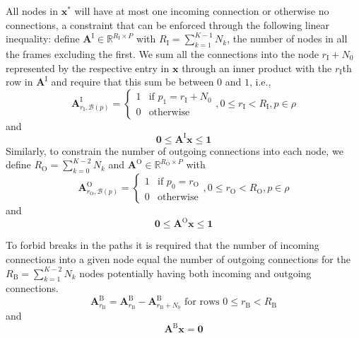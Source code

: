 \documentclass{article}
\newcommand{\BS}[1]{\boldsymbol{#1}}
\begin{document}
\begin{sloppy}
All nodes in $\BS{x}^{\ast}$ will have at most one incoming connection or
otherwise no connections, a constraint that can be enforced through the
following linear inequality: define $\BS{A}^{\text{I}} \in
\mathbb{R}^{R_{\text{I}} \times P}$ with $R_{\text{I}} = \sum_{k=1}^{K-1}
N_{k}$, the number of nodes in all the frames excluding the first. We sum all
the connections into the node $r_{\text{I}} + N_{0}$ represented by the
respective entry in $\BS{x}$ through an inner product with the $r_{\text{I}}$th
row in $\BS{A}^{\text{I}}$ and require that this sum be between $0$ and $1$,
i.e.,
\begin{equation}
    \BS{A}^{\text{I}}_{r_{\text{I}},\mathcal{B}(p)} = \begin{cases}
        1 & \text{if } p_{1} = r_{\text{I}}+N_{0} \\
        0 & \text{otherwise}
    \end{cases}, 0 \leq r_{\text{I}} < R_{\text{I}}, p \in \rho
\end{equation}
and
\begin{equation}
    \BS{0} \leq \BS{A}^{\text{I}}\BS{x} \leq \BS{1}
\end{equation}
Similarly, to constrain the number of outgoing connections into each node, we
define $R_{\text{O}} = \sum_{k=0}^{K-2} N_{k}$ and
$\BS{A}^{\text{O}} \in \mathbb{R}^{R_{\text{O}} \times P}$ with
\begin{equation}
    \BS{A}^{\text{O}}_{r_{\text{O}},\mathcal{B}(p)} = \begin{cases}
        1 & \text{if } p_{0} = r_{\text{O}} \\
        0 & \text{otherwise}
    \end{cases}, 0 \leq r_{\text{O}} < R_{\text{O}}, p \in \rho
\end{equation}
and
\begin{equation}
    \BS{0} \leq \BS{A}^{\text{O}}\BS{x} \leq \BS{1}
\end{equation}

To forbid breaks in the paths it is required that the number of incoming
connections into a given node equal the number of outgoing connections for the
$R_{\text{B}} = \sum_{k=1}^{K-2} N_{k}$ nodes potentially having both incoming
and outgoing connections.
\begin{equation}
    \BS{A}^{\text{B}}_{r_{\text{B}}} = \BS{A}^{\text{B}}_{r_{\text{B}}} -
    \BS{A}^{\text{B}}_{r_{\text{B}}+N_{0}} \text{ for rows } 0 \leq r_{\text{B}}
    < R_{\text{B}}
\end{equation}
and
\begin{equation}
    \label{eq:cxnbalcon}
    \BS{A}^{\text{B}}\BS{x} = \BS{0}
\end{equation}


\end{sloppy}
\end{document}
